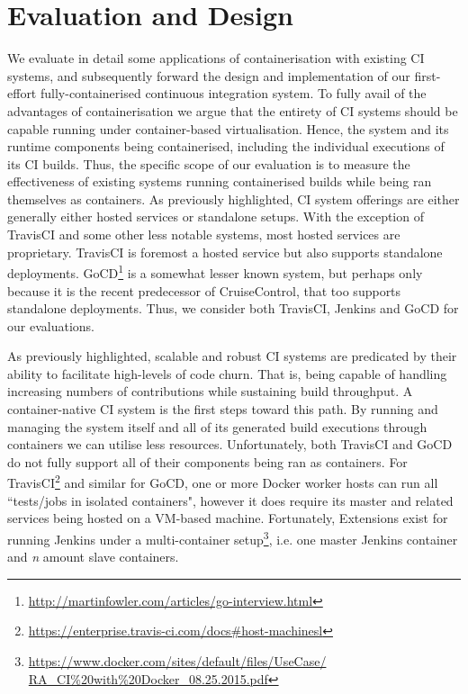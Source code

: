 \documentclass{report}
\begin{document}
\section{Evaluation and Design}
We evaluate in detail some applications of containerisation with existing CI systems, and subsequently forward the design
and implementation of our first-effort fully-containerised continuous integration system. To fully avail of the advantages of containerisation we argue that the entirety of CI systems should be capable running under container-based virtualisation. Hence, the system and its runtime components being containerised, including the individual executions of its CI builds. Thus, the specific scope of our evaluation is to measure the effectiveness of existing systems running containerised builds while being ran themselves as containers. As previously highlighted, CI system
offerings are either generally either hosted services or standalone setups. With the exception of TravisCI and some other 
less notable systems, most hosted services are proprietary. TravisCI is foremost a hosted service but also supports standalone deployments.
GoCD\footnote{\href{http://martinfowler.com/articles/go-interview.html}{http://martinfowler.com/articles/go-interview.html}} is a somewhat lesser known system, but perhaps only because it is the recent predecessor of CruiseControl, that too supports standalone deployments.
Thus, we consider both TravisCI, Jenkins and GoCD for our evaluations.
\par
As previously highlighted, scalable and robust CI systems are 
predicated by their ability to facilitate high-levels of code churn. That is,
being capable of handling increasing numbers of contributions while 
sustaining build throughput. A container-native CI system is the first 
steps toward this path. By running and managing the system itself and all of its generated 
build executions through containers we can utilise less resources. 
Unfortunately, both TravisCI and GoCD do not fully support all of their components 
being ran as containers. For TravisCI\footnote{\href{https://enterprise.travis-ci.com/docs#host-machines}{https://enterprise.travis-ci.com/docs#host-machinesl}} 
and similar for GoCD, one or more Docker worker hosts can run all ``tests/jobs in isolated containers", 
however it does require its master and related services being hosted on a VM-based machine.
Fortunately, Extensions exist for running Jenkins under a multi-container setup\footnote{\href{https://www.docker.com/sites/default/files/UseCase/RA_CI\%20with\%20Docker_08.25.2015.pdf}{https://www.docker.com/sites/default/files/UseCase/\\RA_CI\%20with\%20Docker_08.25.2015.pdf}}, i.e.
one master Jenkins container and \textit{n} amount slave containers.
\end{document}
